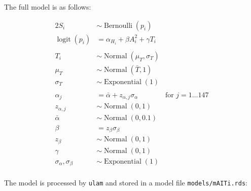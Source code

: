 \documentclass[article, a4paper, 12pt]{memoir}
\DeclareMathOperator{\logit}{logit}
\DeclareMathOperator{\normal}{Normal}
\DeclareMathOperator{\exponential}{Exponential}
\DeclareMathOperator{\bernoulli}{Bernoulli}
\begin{document}
The full model is as follows:

\begin{alignat*}{2}
    S_i& \sim \bernoulli(p_i)&\\
    \logit(p_i)& = \alpha_{H_i} + \beta A_i^2 + \gamma T_i\\
    \\
    T_i& \sim \normal(\mu_T, \sigma_T)\\
    \mu_T& \sim \normal(\bar{T}, 1)\\
    \sigma_T& \sim \exponential(1)&\\
    \\
    \alpha_j& = \bar{\alpha} + z_{\alpha,j}\sigma_\alpha{}& \text{for $j = 1 \dots 147$}\\
    z_{\alpha,j}& \sim \normal(0,1)&\\
    \bar{\alpha}& \sim \normal(0, 0.1)&\\
    \beta& = z_{\beta}\sigma_\beta&\\
    z_{\beta}& \sim \normal(0,1)&\\
    \gamma& \sim \normal(0,1)\\
    \sigma_\alpha, \sigma_\beta& \sim \exponential(1)&\\
\end{alignat*}

The model is processed by \texttt{ulam} and stored in a model file \texttt{models/mAITi.rds}:



\printbibliography{}


% 
\end{document}
